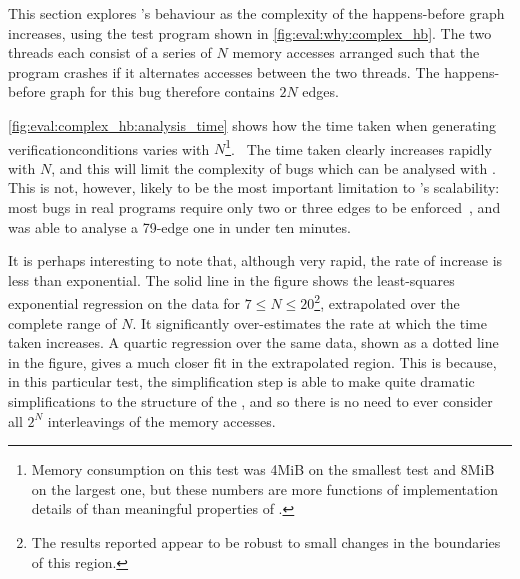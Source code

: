 \noindent
This section explores {\technique}'s behaviour as the complexity of
the happens-before graph increases, using the test program shown in
\autoref{fig:eval:why:complex_hb}.  The two threads each consist of a
series of $N$ memory accesses arranged such that the program crashes
if it alternates accesses between the two threads.  The happens-before
graph for this bug therefore contains $2N$ edges.

\begin{sanefig}
  \caption{Time taken to analyse the $_N$ test,
    for varying values of $N$.  Note log scale.  Each abscissae was
    sampled eleven times, discarding the first, in random order.
    Crosses and bars give the mean and 90\% confidence interval of the
    mean, calculated using the central limit theorem.  The solid line
    shows a least squares regression onto ${\alpha}e^{{\beta}N} +
    \gamma$ over $7 \leq N \leq 20$ extrapolated to the full range of
    $N$; the dashed one shows a quartic regression over the same data.
    Grey regions give 90\% confidence intervals for the regression
    lines, computed using a 1,000 replicate bootstrap.  Note that the
    regressions minimise the sum of squares loss, but are plotted on a
    logarithmic scale.}
  \label{fig:eval:complex_hb:analysis_time}
\end{sanefig}

\autoref{fig:eval:complex_hb:analysis_time} shows how the time taken
when generating \glspl{verificationcondition} varies with
$N$\footnote{Memory consumption on this test was 4MiB on the smallest
  test and 8MiB on the largest one, but these numbers are more
  functions of implementation details of {\implementation} than
  meaningful properties of {\technique}.}\!\!\!.  ~The time taken clearly
increases rapidly with $N$, and this will limit the complexity of bugs
which can be analysed with {\technique}.  This is not, however, likely
to be the most important limitation to {\technique}'s scalability:
most bugs in real programs require only two or three edges to be
enforced~\cite{Musuvathi2008}, and {\technique} was able to analyse a
79-edge one in under ten minutes.

It is perhaps interesting to note that, although very rapid, the rate
of increase is less than exponential.  The solid line in the figure
shows the least-squares exponential regression on the data for $7 \leq
N \leq 20$\footnote{The results reported appear to be robust to small
  changes in the boundaries of this region.}\!\hspace{-.1ex}\!,
extrapolated over the complete range of $N$.  It significantly
over-estimates the rate at which the time taken increases.  A quartic
regression over the same data, shown as a dotted line in the figure,
gives a much closer fit in the extrapolated region.  This is because,
in this particular test, the {\StateMachine} simplification step is
able to make quite dramatic simplifications to the structure of the
{\StateMachines}, and so there is no need to ever consider all $2^N$
interleavings of the memory accesses.

